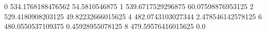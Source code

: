 0 534.1768188476562 54.5810546875
1 539.6717529296875 60.07598876953125
2 529.4180908203125 49.82232666015625
4 482.0743103027344 2.478546142578125
6 480.0550537109375 0.45928955078125
8 479.59576416015625 0.0
